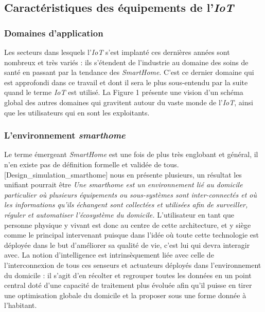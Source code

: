 \documentclass[]{article}
\begin{document}
\subsection{Caractéristiques des équipements de l'\textit{IoT}}

\subsubsection{Domaines d'application}

Les secteurs dans lesquels l'\textit{IoT} s'est implanté ces dernières années sont nombreux et très variés : ils s'étendent de l'industrie au domaine des soins de santé en passant par la tendance des \textit{SmartHome}. C'est ce dernier domaine qui est approfondi dans ce travail et dont il sera le plus sous-entendu par la suite quand le terme \textit{IoT} est utilisé. La Figure 1 présente une vision d'un schéma global des autres domaines qui gravitent autour du vaste monde de l'\textit{IoT}, ainsi que les utilisateurs qui en sont les exploitants.\\

\newpage

\subsubsection{L'environnement \textit{smarthome}}
\par Le terme émergeant \textit{SmartHome} est une fois de plus très englobant et général, il n'en existe pas de définition formelle et validée de tous. [Design\_simulation\_smarthome] nous en présente plusieurs, un résultat les unifiant pourrait être \textit{Une smarthome est un environnement lié au domicile particulier où plusieurs équipements ou sous-systèmes sont inter-connectés et où les informations qu'ils échangent sont collectées et utilisées afin de surveiller, réguler et automatiser l'écosystème du domicile.} L'utilisateur en tant que personne physique y vivant est donc au centre de cette architecture, et y siège comme le principal intervenant puisque dans l'idée où toute cette technologie est déployée dans le but d'améliorer sa qualité de vie, c'est lui qui devra interagir avec. La notion d'intelligence est intrinsèquement liée avec celle de l'interconnexion de tous ces senseurs et actuateurs déployés dans l'environnement du domicile : il s'agit d'en récolter et regrouper toutes les données en un point central doté d'une capacité de traitement plus évoluée afin qu'il puisse en tirer une optimisation globale du domicile et la proposer sous une forme donnée à l'habitant.\\
\end{document}
